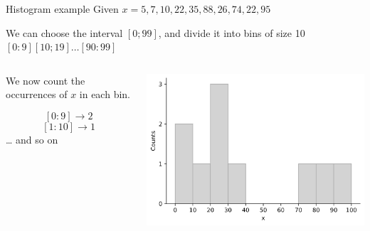 \documentclass[9pt, aspectratio=169]{beamer}
\begin{document}
\begin{frame}
    {Histogram example}
    Given $x = {5, 7, 10, 22, 35, 88, 26, 74, 22, 95}$

    We can choose the interval $[0; 99]$, and divide it into bins of size 10 $[0:9] [10; 19] \dots [90:99]$
    \pause
    \begin{columns}
        \begin{column}{0.5\textwidth}
            We now count the occurrences of $x$ in each bin.

            $$[0:9] \rightarrow 2$$
            $$[1:10] \rightarrow 1$$
            \dots
            and so on
        \end{column}
        \pause
        \begin{column}{0.5\textwidth}
            \includegraphics[width=\textwidth]{example_histogram.png}


        \end{column}
    \end{columns}
\end{frame}
\end{document}
